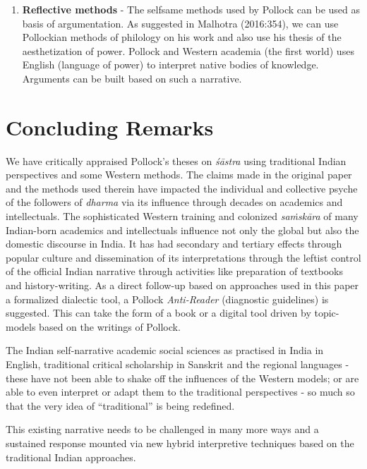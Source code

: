 \begin{enumerate}
\item {\bf Reflective methods} - The selfsame methods used by Pollock can be used as basis of argumentation. As suggested in Malhotra (2016:354), we can use Pollockian methods of philology on his work and also use his thesis of the aesthetization of power. Pollock and Western academia (the first world) uses English (language of power) to interpret native bodies of knowledge. Arguments can be built based on such a narrative.
\end{enumerate}

\section*{Concluding Remarks}

We have critically appraised Pollock's theses on {\sl śāstra} using traditional Indian perspectives and some Western methods. The claims made in the original paper and the methods used therein have impacted the individual and collective psyche of the followers of {\sl dharma} via its influence through decades on academics and intellectuals. The sophisticated Western training and colonized {\sl saṁskāra} of many Indian-born academics and intellectuals influence not only the global but also the domestic discourse in India. It has had secondary and tertiary effects through popular culture and dissemination of its interpretations through the leftist control of the official Indian narrative through activities like preparation of textbooks and history-writing. As a direct follow-up based on approaches used in this paper a formalized dialectic tool, a Pollock {\sl Anti-Reader} (diagnostic guidelines) is suggested. This can take the form of a book or a digital tool driven by topic-models based on the writings of Pollock.

The Indian self-narrative academic social sciences as practised in India in English, traditional critical scholarship in Sanskrit and the regional languages  - these have not been able to shake off the influences of the Western models; or are able to even interpret or adapt them to the traditional perspectives - so much so that the very idea of ``traditional'' is being redefined.

This existing narrative needs to be challenged in many more ways and a sustained response mounted via new hybrid interpretive techniques based on the traditional Indian approaches. 

